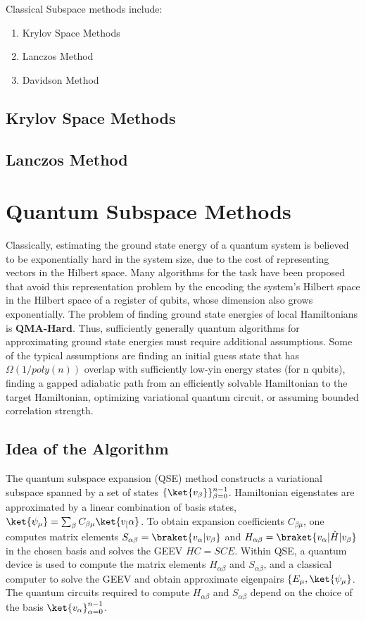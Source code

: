 \documentclass[12pt, oneside]{book}
\theoremstyle{definition}
\theoremstyle{definition}
\theoremstyle{remark}
\begin{document}
Classical Subspace methods include:
\begin{enumerate}
    \item Krylov Space Methods
    \item Lanczos Method
    \item Davidson Method
\end{enumerate}
\subsection{Krylov Space Methods}
\subsection{Lanczos Method}

\section{Quantum Subspace Methods}
Classically, estimating the ground state energy of a quantum system is believed to be exponentially hard in the system size, due to the cost of representing vectors in the Hilbert space. Many algorithms for the task have been proposed that avoid this representation problem by the encoding the system's Hilbert space in the Hilbert space of a register of qubits, whose dimension also grows exponentially. The problem of finding ground state energies of local Hamiltonians is \textbf{QMA-Hard}. Thus, sufficiently generally quantum algorithms for approximating ground state energies must require additional assumptions.
Some of the typical assumptions are finding an initial guess state that has $\Omega(1/poly(n))$ overlap with sufficiently low-yin energy states (for n qubits), finding a gapped adiabatic path from an efficiently solvable Hamiltonian to the target Hamiltonian, optimizing variational quantum circuit, or assuming bounded correlation strength.

\subsection{Idea of the Algorithm}
The quantum subspace expansion (QSE) method constructs a variational subspace spanned by a set of states $\{\ket{v_\beta}\}_{\beta=0}^{n-1}$. Hamiltonian eigenstates are approximated by a linear combination of basis states, $\ket{\psi_{\mu}}=\sum_{\beta} C_{\beta\mu}\ket{v_[\alpha}$. To obtain expansion coefficients $C_{\beta\mu}$, one computes matrix elements $S_{\alpha\beta}=\braket{v_{\alpha}|v_\beta}$ and $H_{\alpha\beta}=\braket{v_{\alpha}|\hat{H}|v_{\beta}}$ in the chosen basis and solves the GEEV $HC=SCE$. Within QSE, a quantum device is used to compute the matrix elements $H_{\alpha\beta}$ and $S_{\alpha\beta}$, and a classical computer to solve the GEEV and obtain approximate eigenpairs $\{E_{\mu},\ket{\psi_{\mu}}$. The quantum circuits required to compute $H_{\alpha\beta}$ and $S_{\alpha\beta}$ depend on the choice of the basis $\ket{v_{\alpha}}_{\alpha=0}^{n-1}$.
\end{document}
